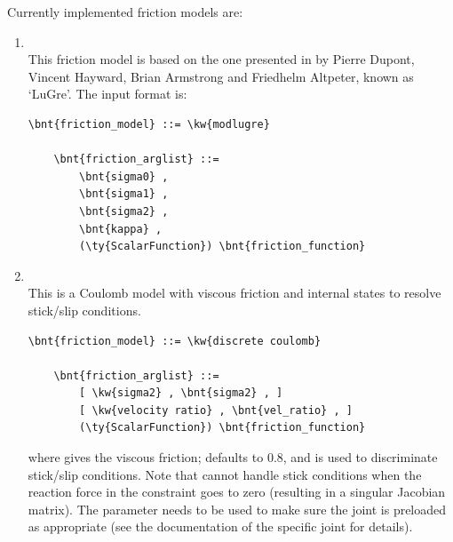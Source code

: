 Currently implemented friction models are:
\begin{enumerate}
\item {}\\
This friction model is based on the one presented in \cite{LUGRE-2002}
by Pierre Dupont, Vincent Hayward, Brian Armstrong and Friedhelm Altpeter,
known as `LuGre'.
The input format is:
\begin{Verbatim}[commandchars=\\\{\}]
    \bnt{friction_model} ::= \kw{modlugre}

    \bnt{friction_arglist} ::=
        \bnt{sigma0} ,
        \bnt{sigma1} ,
        \bnt{sigma2} ,
        \bnt{kappa} ,
        (\ty{ScalarFunction}) \bnt{friction_function}
\end{Verbatim}

    \item {}\\
    This is a Coulomb model with viscous friction and
    internal states to resolve stick/slip conditions.
\begin{Verbatim}[commandchars=\\\{\}]
    \bnt{friction_model} ::= \kw{discrete coulomb}

    \bnt{friction_arglist} ::=
        [ \kw{sigma2} , \bnt{sigma2} , ]
        [ \kw{velocity ratio} , \bnt{vel_ratio} , ]
        (\ty{ScalarFunction}) \bnt{friction_function}
\end{Verbatim}
    where  gives the viscous friction;
     defaults to 0.8, and is used
    to discriminate stick/slip conditions.
    Note that 
    cannot handle stick conditions when the reaction force
    in the constraint goes to zero (resulting in a singular Jacobian matrix).
    The  parameter needs to be used to make sure
    the joint is preloaded as appropriate
    (see the documentation of the specific joint for details).
\end{enumerate}

